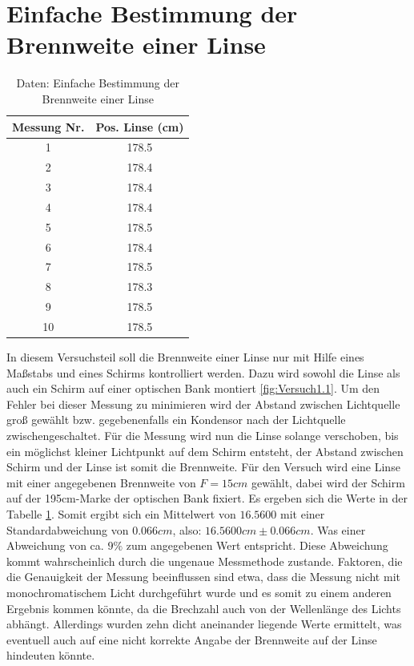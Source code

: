 \section{Einfache Bestimmung der Brennweite einer Linse}
\begin{table}[]
    \centering
    \begin{tabular}{|c|c|}
    	\hline
    	Messung Nr. & Pos. Linse (cm) \\
    	\hline
    	1 & 178.5 \\
    	\hline
    	2 & 178.4 \\
    	\hline
    	3 & 178.4 \\
    	\hline
    	4 & 178.4 \\
    	\hline
    	5 & 178.5 \\
    	\hline
    	6 & 178.4 \\
    	\hline
    	7 & 178.5 \\
    	\hline
    	8 & 178.3 \\
    	\hline
    	9 & 178.5 \\
    	\hline
    	10 & 178.5 \\
    	\hline
    
    \end{tabular}
    \caption{Daten: Einfache Bestimmung der Brennweite einer Linse}
    \label{tab:Daten1}
\end{table}


In diesem Versuchsteil soll die Brennweite einer Linse nur mit Hilfe eines Maßstabs und eines Schirms kontrolliert werden. Dazu wird sowohl die Linse als auch ein Schirm auf einer optischen Bank montiert \ref{fig:Versuch1.1}. Um den Fehler bei dieser Messung zu minimieren wird der Abstand zwischen Lichtquelle groß gewählt bzw. gegebenenfalls ein Kondensor nach der Lichtquelle zwischengeschaltet. Für die Messung wird nun die Linse solange verschoben, bis ein möglichst kleiner Lichtpunkt auf dem Schirm entsteht, der Abstand zwischen Schirm und der Linse ist somit die Brennweite. Für den Versuch wird eine Linse mit einer angegebenen Brennweite von $F = 15 cm$ gewählt, dabei wird der Schirm auf der 195cm-Marke der optischen Bank fixiert. Es ergeben sich die Werte in der Tabelle \ref{tab:Daten1}. Somit ergibt sich ein Mittelwert von $16.5600$ mit einer Standardabweichung von $0.066cm$, also: $16.5600cm \pm 0.066cm$. Was einer Abweichung von ca. $9 \% $ zum angegebenen Wert entspricht. Diese Abweichung kommt wahrscheinlich durch die ungenaue Messmethode zustande. Faktoren, die die Genauigkeit der Messung beeinflussen sind etwa, dass die Messung nicht mit monochromatischem Licht durchgeführt wurde und es somit zu einem anderen Ergebnis kommen könnte, da die Brechzahl auch von der Wellenlänge des Lichts abhängt. Allerdings wurden zehn dicht aneinander liegende Werte ermittelt, was eventuell auch auf eine nicht korrekte Angabe der Brennweite auf der Linse hindeuten könnte.


